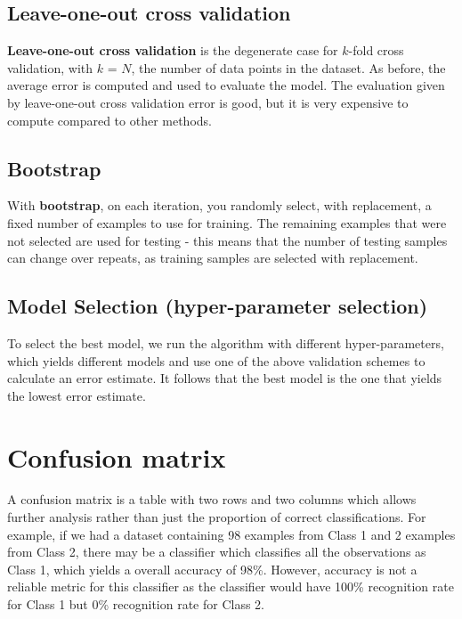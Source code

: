 \documentclass[11pt,fleqn]{book} %
\begin{document}
\newpage
\subsection{Leave-one-out cross validation}
\textbf{Leave-one-out cross validation} is the degenerate case for $k$-fold cross validation, with $k$ = $N$, the number of data points in the dataset. As before, the average error is computed and used to evaluate the model. The evaluation given by leave-one-out cross validation error is good, but it is very expensive to compute compared to other methods.

\subsection{Bootstrap}
With \textbf{bootstrap}, on each iteration, you randomly select, with replacement, a fixed number of examples to use for training. The remaining examples that were not selected are used for testing - this means that the number of testing samples can change over repeats, as training samples are selected with replacement.

\subsection*{Model Selection (hyper-parameter selection)}
To select the best model, we run the algorithm with different hyper-parameters, which yields different models and use one of the above validation schemes to calculate an error estimate. It follows that the best model is the one that yields the lowest error estimate.

\section{Confusion matrix}
A confusion matrix is a table with two rows and two columns which allows further analysis rather than just the proportion of correct classifications. For example, if we had a dataset containing 98 examples from Class 1 and 2 examples from Class 2, there may be a classifier which classifies all the observations as Class 1, which yields a overall accuracy of 98\%. However, accuracy is not a reliable metric for this classifier as the classifier would have 100\% recognition rate for Class 1 but 0\% recognition rate for Class 2.\\
\end{document}
